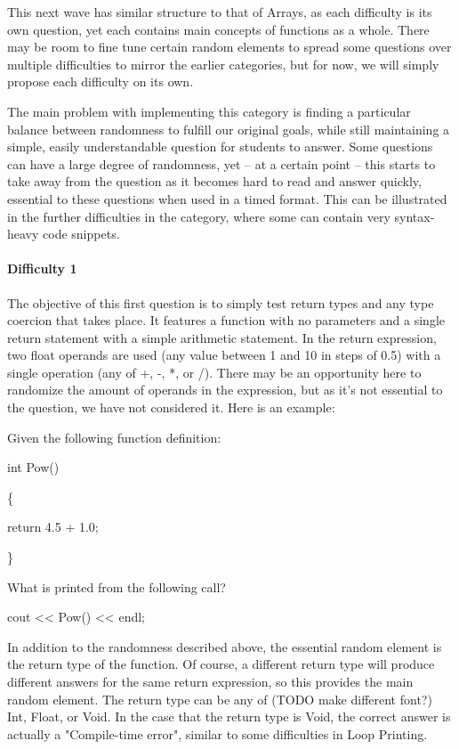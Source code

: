 \documentclass{article}
\begin{document}
This next wave has similar structure to that of Arrays, as each difficulty is its own question, yet each contains main concepts of functions as a whole. There may be room to fine tune certain 
random elements to spread some questions over multiple difficulties to mirror the earlier categories, but for now, we will simply propose each difficulty on its own. 

The main problem with implementing this category is finding a particular balance between randomness to fulfill our original goals, while still maintaining a simple, easily understandable question for students to answer. Some questions can have a large degree of randomness, yet -- at a certain point -- this starts to take away from the question as it becomes hard to read and answer quickly, essential to these questions when used in a timed format. This can be illustrated in the further difficulties in the category, where some can contain very syntax-heavy code snippets.

\paragraph{Difficulty 1} \hfill \par

The objective of this first question is to simply test return types and any type coercion that takes place. It features a function with no parameters and a single return statement with a simple arithmetic statement. In the return expression, two float operands are used (any value between 1 and 10 in steps of 0.5) with a single operation (any of +, -, *, or /). There may be an opportunity here to randomize the amount of operands in the expression, but as it's not essential to the question, we have not considered it. Here is an example:

\hfill \par
Given the following function definition: \par
int Pow() \par
\{ \par
	return 4.5 + 1.0; \par
\} \par
What is printed from the following call? \par
cout << Pow() << endl; \par
\hfill \par

In addition to the randomness described above, the essential random element is the return type of the function. Of course, a different return type will produce different answers for the same return expression, so this provides the main random element. The return type can be any of (TODO make different font?) Int, Float, or Void. In the case that the return type is Void, the correct
answer is actually a "Compile-time error", similar to some difficulties in Loop Printing. 
\end{document}
